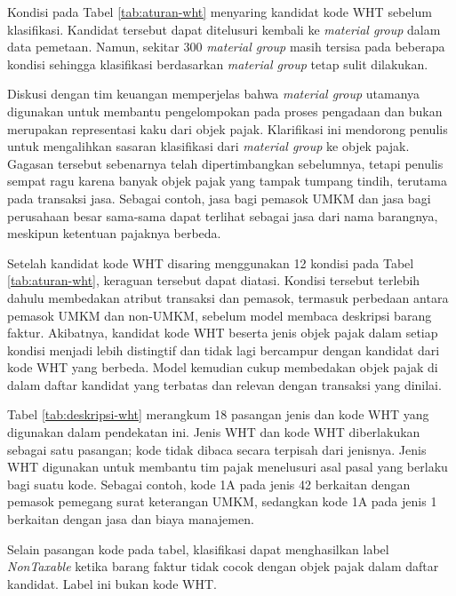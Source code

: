 

Kondisi pada Tabel \ref{tab:aturan-wht} menyaring kandidat kode WHT sebelum klasifikasi. Kandidat tersebut dapat ditelusuri kembali ke \textit{material group} dalam data pemetaan. Namun, sekitar 300 \textit{material group} masih tersisa pada beberapa kondisi sehingga klasifikasi berdasarkan \textit{material group} tetap sulit dilakukan.

Diskusi dengan tim keuangan memperjelas bahwa \textit{material group} utamanya digunakan untuk membantu pengelompokan pada proses pengadaan dan bukan merupakan representasi kaku dari objek pajak. Klarifikasi ini mendorong penulis untuk mengalihkan sasaran klasifikasi dari \textit{material group} ke objek pajak. Gagasan tersebut sebenarnya telah dipertimbangkan sebelumnya, tetapi penulis sempat ragu karena banyak objek pajak yang tampak tumpang tindih, terutama pada transaksi jasa. Sebagai contoh, jasa bagi pemasok UMKM dan jasa bagi perusahaan besar sama-sama dapat terlihat sebagai jasa dari nama barangnya, meskipun ketentuan pajaknya berbeda.

Setelah kandidat kode WHT disaring menggunakan 12 kondisi pada Tabel \ref{tab:aturan-wht}, keraguan tersebut dapat diatasi. Kondisi tersebut terlebih dahulu membedakan atribut transaksi dan pemasok, termasuk perbedaan antara pemasok UMKM dan non-UMKM, sebelum model membaca deskripsi barang faktur. Akibatnya, kandidat kode WHT beserta jenis objek pajak dalam setiap kondisi menjadi lebih distingtif dan tidak lagi bercampur dengan kandidat dari kode WHT yang berbeda. Model kemudian cukup membedakan objek pajak di dalam daftar kandidat yang terbatas dan relevan dengan transaksi yang dinilai.

Tabel \ref{tab:deskripsi-wht} merangkum 18 pasangan jenis dan kode WHT yang digunakan dalam pendekatan ini. Jenis WHT dan kode WHT diberlakukan sebagai satu pasangan; kode tidak dibaca secara terpisah dari jenisnya. Jenis WHT digunakan untuk membantu tim pajak menelusuri asal pasal yang berlaku bagi suatu kode. Sebagai contoh, kode 1A pada jenis 42 berkaitan dengan pemasok pemegang surat keterangan UMKM, sedangkan kode 1A pada jenis 1 berkaitan dengan jasa dan biaya manajemen.



Selain pasangan kode pada tabel, klasifikasi dapat menghasilkan label \textit{NonTaxable} ketika barang faktur tidak cocok dengan objek pajak dalam daftar kandidat. Label ini bukan kode WHT.

